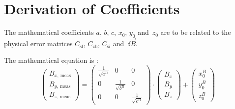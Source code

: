 \chapter{Derivation of Coefficients \label{sec:app:deriv_of_coeff}}
The mathematical coefficients $a$, $b$, $c$, $x_0$, $y_0$ and~$z_0$ are to be related to the physical error matrices $C_{\mathrm{sf}}$, $C_\mathrm{zb}$, $C_\mathrm{si}$ and~$\delta\vec{B}$.

The mathematical equation is :
\begin{equation}
    \begin{pmatrix}B_{x,\ \mathrm{meas}} \\ B_{y,\ \mathrm{meas}}\\ B_{z,\ \mathrm{meas}} \end{pmatrix} = \begin{pmatrix} \frac{1}{\sqrt{a^B}} & 0 & 0 \\
                                                0 & \frac{1}{\sqrt{b^B}} & 0 \\
                                                0 & 0 & \frac{1}{\sqrt{c^B}}
                                                \end{pmatrix}\cdot\begin{pmatrix}
                                                    B_x \\ B_y \\ B_z
                                                \end{pmatrix}+\begin{pmatrix}
                                                    x_0^B \\ y_0^B \\ z_0^B
                                                \end{pmatrix}
\end{equation}

